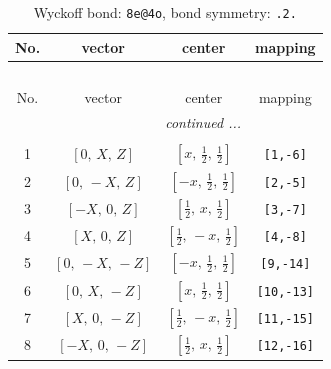 \documentclass[fleqn,8pt]{jsarticle}
\begin{document}
\begin{longtable}{cccc}
\caption{Wyckoff bond: {\tt 8e@4o}, bond symmetry: {\tt .2.}}
 \\
 \hline \hline
No. & vector & center & mapping \\ \hline \endfirsthead

\multicolumn{3}{l}{\tablename\ \thetable{}} \\
 \hline \hline
No. & vector & center & mapping \\ \hline \endhead

 \hline \hline
\multicolumn{3}{r}{\footnotesize\it continued ...} \\ \endfoot

 \hline \hline
\multicolumn{3}{r}{} \\ \endlastfoot

1 & $\left[ 0,\, X,\, Z \right]$ & $\left[ x,\, \frac{1}{2},\, \frac{1}{2} \right]$ & {\tt [1,-6]} \\ \hline
2 & $\left[ 0,\, - X,\, Z \right]$ & $\left[ - x,\, \frac{1}{2},\, \frac{1}{2} \right]$ & {\tt [2,-5]} \\ \hline
3 & $\left[ - X,\, 0,\, Z \right]$ & $\left[ \frac{1}{2},\, x,\, \frac{1}{2} \right]$ & {\tt [3,-7]} \\ \hline
4 & $\left[ X,\, 0,\, Z \right]$ & $\left[ \frac{1}{2},\, - x,\, \frac{1}{2} \right]$ & {\tt [4,-8]} \\ \hline
5 & $\left[ 0,\, - X,\, - Z \right]$ & $\left[ - x,\, \frac{1}{2},\, \frac{1}{2} \right]$ & {\tt [9,-14]} \\ \hline
6 & $\left[ 0,\, X,\, - Z \right]$ & $\left[ x,\, \frac{1}{2},\, \frac{1}{2} \right]$ & {\tt [10,-13]} \\ \hline
7 & $\left[ X,\, 0,\, - Z \right]$ & $\left[ \frac{1}{2},\, - x,\, \frac{1}{2} \right]$ & {\tt [11,-15]} \\ \hline
8 & $\left[ - X,\, 0,\, - Z \right]$ & $\left[ \frac{1}{2},\, x,\, \frac{1}{2} \right]$ & {\tt [12,-16]} \\
\end{longtable}
\renewcommand{\arraystretch}{1.2}
\end{document}
